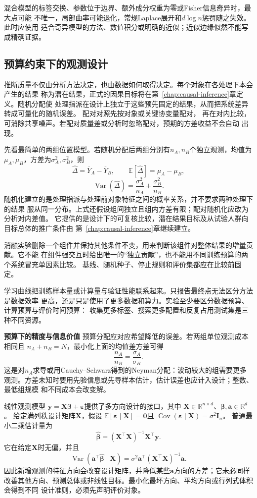 混合模型的标签交换、参数位于边界、额外成分权重为零或Fisher信息奇异时，最大点可能
不唯一，局部曲率可能退化，常规Laplace展开和\(d\log n\)惩罚随之失效。此时应使用
适合奇异模型的方法、数值积分或明确的近似；近似边缘似然不能写成精确证据。

\subsection{预算约束下的观测设计}
\label{sec:statistics-design-information}
推断质量不仅由分析方法决定，也由数据如何取得决定。每个对象在各处理下本会产生的结果
称为潜在结果，正式的因果目标将在第~\ref{chap:causal-inference}章定义。随机分配使
处理指派在设计上独立于这些预先固定的结果，从而把系统差异转成可量化的随机误差。
配对对照先按对象或关键协变量配对，
再在对内比较，可消除共享噪声。若配对质量差或分析时忽略配对，预期的方差收益不会自动
出现。

先看最简单的两组位置模型。若随机分配后两组分别有\(n_A,n_B\)个独立观测，均值为
\(\mu_A,\mu_B\)，方差为\(\sigma_A^2,\sigma_B^2\)，则
\[
  \widehat\Delta=\overline Y_A-\overline Y_B,\qquad
  \mathbb{E}[\widehat\Delta]=\mu_A-\mu_B,
\]
\[
  \operatorname{Var}(\widehat\Delta)
  =\frac{\sigma_A^2}{n_A}+\frac{\sigma_B^2}{n_B}.
\]
随机化建立的是处理指派与处理前对象特征之间的概率关系，并不要求两种处理下的结果
服从同一分布。上式还假设组间独立且组内方差有限；配对随机化应改为分析对内差值。
它提供的是设计下的可复核比较，潜在结果目标及从试验人群向目标总体的推广条件由
第~\ref{chap:causal-inference}章继续建立。

消融实验删除一个组件并保持其他条件不变，用来判断该组件对整体结果的增量贡献。它不能
在组件强交互时给出唯一的“独立贡献”，也不能用不同训练预算的两个系统冒充单因素比较。
基线、随机种子、停止规则和评价集都应在比较前固定。

学习曲线把训练样本量或计算量与验证性能联系起来。只报告最终点无法区分方法是数据效率
更高，还是只是使用了更多数据和算力。实验至少要区分数据预算、计算预算与评价时间预算：
收集更多标签、搜索更多配置和反复占用测试集是三种不同资源。

\par\medskip\noindent\textbf{预算下的精度与信息价值}\quad
预算分配应对应希望降低的误差。若两组单位观测成本相同且
\(n_A+n_B=N\)，最小化上面的均值差方差可得
\[
  \frac{n_A}{n_B}=\frac{\sigma_A}{\sigma_B}.
\]
这是对\(n_A\)求导或用Cauchy--Schwarz得到的Neyman分配：波动较大的组需要更多
观测。方差未知时要用先验信息或先导样本估计，估计误差也应计入设计；整数、最低组规模
和不同成本会改变解。

线性观测模型
\(\bm y=\bm X\bm\beta+\bm\varepsilon\)提供了多方向设计的接口，其中
\(\bm X\in\mathbb{R}^{n\times d}\)、\(\bm\beta,\bm a\in\mathbb{R}^d\)。
给定满列秩设计矩阵\(\bm X\)，假设
\(\mathbb{E}[\bm\varepsilon\mid\bm X]=\bm{0}\)且
\(\operatorname{Cov}(\bm\varepsilon\mid\bm X)=\sigma^2\bm I_n\)。
普通最小二乘估计量为
\[
  \widehat{\bm\beta}
  =(\bm X^\top\bm X)^{-1}\bm X^\top\bm y.
\]
它在给定\(\bm X\)时无偏，并且
\[
  \operatorname{Var}(\bm a^\top\widehat{\bm\beta}\mid\bm X)
  =\sigma^2\bm a^\top(\bm X^\top\bm X)^{-1}\bm a.
\]
因此新增观测的特征方向会改变设计矩阵，并降低某些\(\bm a\)方向的方差；它未必同样
改善其他方向、预测总体或非线性目标。最小化最坏方向、平均方向或行列式体积会得到不同
设计准则，必须先声明评价对象。

